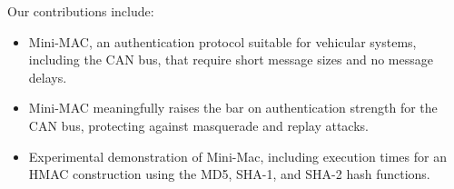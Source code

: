 Our contributions include:
\begin{itemize}

\item Mini-MAC, an authentication protocol suitable for vehicular systems, including the CAN bus, 
that require short message sizes and no message delays.

\item Mini-MAC meaningfully raises the bar on authentication strength for the CAN bus, protecting against
masquerade and replay attacks.

\item Experimental demonstration of Mini-Mac, including execution times for an HMAC
construction using the MD5, SHA-1, and SHA-2 hash functions.

\end{itemize}